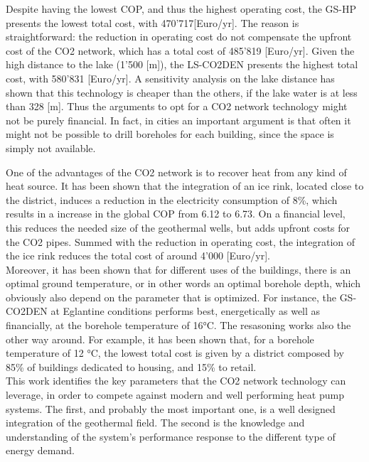 \documentclass{article}
\begin{document}
Despite having the lowest COP, and thus the highest operating cost, the GS-HP presents the lowest total cost, with 470'717[Euro/yr]. The reason is straightforward: the reduction in operating cost do not compensate the upfront cost of the CO2 network, which has a total cost of 485'819 [Euro/yr]. Given the high distance to the lake (1'500 [m]), the LS-CO2DEN presents the highest total cost, with 580'831 [Euro/yr]. A sensitivity analysis on the lake distance has shown that this technology is cheaper than the others, if the lake water is at less than 328 [m]. Thus the arguments to opt for a CO2 network technology might not be purely financial. In fact, in cities an important argument is that often it might not be possible to drill boreholes for each building, since the space is simply not available.

One of the advantages of the CO2 network is to recover heat from any kind of heat source. It has been shown that the integration of an ice rink, located close to the district, induces a reduction in the electricity consumption of 8\%, which results in a increase in the global COP from 6.12 to 6.73. On a financial level, this reduces the needed size of the geothermal wells, but adds upfront costs for the CO2 pipes. Summed with the reduction in operating cost, the integration of the ice rink reduces the total cost of around 4'000 [Euro/yr].\\

Moreover, it has been shown that for different uses of the buildings, there is an optimal ground temperature, or in other words an optimal borehole depth, which obviously also depend on the parameter that is optimized. For instance, the GS-CO2DEN at Eglantine conditions performs best, energetically as well as financially, at the borehole temperature of 16\si{\celsius}. The resasoning works also the other way around. For example, it has been shown that, for a borehole temperature of 12 \si{\celsius}, the lowest total cost is given by a district composed by 85\% of buildings dedicated to housing, and 15\% to retail.\\

This work identifies the key parameters that the CO2 network technology can leverage, in order to compete against modern and well performing heat pump systems. The first, and probably the most important one, is a well designed integration of the geothermal field. The second is the knowledge and understanding of the system's performance response to the different type of energy demand.\\
\end{document}
